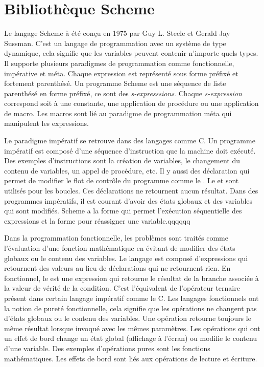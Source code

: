 
\chapter{Bibliothèque Scheme}

Le langage Scheme\cite{Scheme} à été conçu en 1975 par Guy L. Steele et Gerald
Jay Sussman.  C'est un langage de programmation avec un système de type
dynamique, cela signifie que les variables peuvent contenir n'importe quels
types. Il supporte plusieurs paradigmes de programmation comme fonctionnelle,
impérative et méta. Chaque expression est représenté sous forme préfixé et
fortement parenthésé.  Un programme Scheme est une séquence de liste parenthésé
en forme préfixé, ce sont des \textit{s-expresssions}.  Chaque
\textit{s-expression} correspond soit à une constante, une application de
procédure ou une application de macro. Les macros sont lié au paradigme de
programmation méta qui manipulent les expressions.

Le paradigme impératif se retrouve dans des langages comme C. Un programme
impératif est composé d'une séquence d'instruction que la machine doit exécuté.
Des exemples d'instructions sont la création de variables, le changement du
contenu de variables, un appel de procédure, etc. Il y aussi des déclaration
qui permet de modifier le flot de contrôle du programme comme le .
Le  et  sont utilisés pour les boucles. Ces
déclarations ne retournent aucun résultat.  Dans des programmes impératifs, il est
courant d'avoir des états globaux et des variables qui sont
modifiés. Scheme a la forme  qui permet l'exécution
séquentielle des expressions et la forme  pour réassigner une
variable.qqqqqq


Dans la programmation fonctionnelle, les problèmes sont traités comme
l'évaluation d'une fonction mathématique en évitant de modifier des états
globaux ou le contenu des variables. Le langage est composé d'expressions qui
retournent des valeurs au lieu de déclarations qui ne retournent rien. En
fonctionnel, le  est une expression qui retourne le résultat de la
branche associée à la valeur de vérité de la condition. C'est l'équivalent de
l'opérateur ternaire présent dans certain langage impératif comme  le C. Les
langages fonctionnels ont la notion de pureté fonctionnelle, cela signifie que
les opérations ne changent pas d'états globaux ou le contenu des variables. Une
opération retourne toujours le même résultat lorsque invoqué avec les mêmes
paramètres. Les opérations qui ont un effet de bord change un état global
(affichage à l'écran) ou modifie le contenu d'une variable.  Des exemples
d'opérations pures sont les fonctions mathématiques. Les effets de bord sont
liés aux opérations de lecture et écriture.

